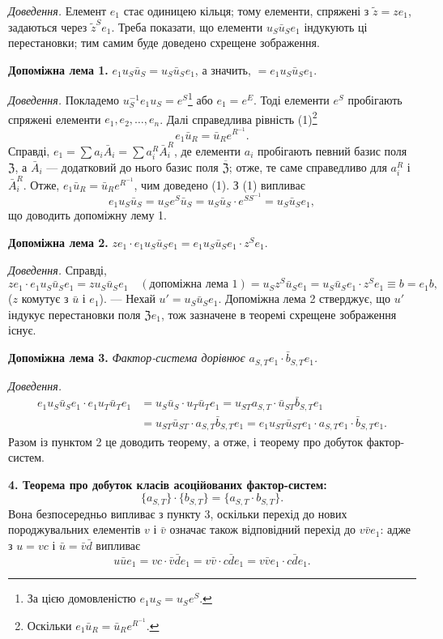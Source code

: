 \documentclass[11pt]{article}
\newcommand{\srcfn}[2]{\footnote{#2}}
\begin{document}
\noindent\emph{Доведення.} Елемент \(e_1\) стає одиницею кільця; тому елементи, спряжені з \(\tilde z=ze_1\), задаються через \(\tilde z^Se_1\). Треба показати, що елементи \(u_S\bar u_Se_1\) індукують ці перестановки; тим самим буде доведено схрещене зображення.

\noindent\textbf{Допоміжна лема 1.} \(e_1u_S\bar u_S=u_S\bar u_Se_1\), а значить, \(=e_1u_S\bar u_Se_1\).

\noindent\emph{Доведення.} Покладемо \(u_S^{-1}e_1u_S=e^S\)\srcfn{1}{За цією домовленістю \(e_1u_S=u_Se^S\).} або \(e_1=e^E\). Тоді елементи \(e^S\) пробігають спряжені елементи \(e_1,e_2,\ldots,e_n\). Далі справедлива рівність (1)\srcfn{2}{Оскільки \(e_1\bar u_R=\bar u_Re^{R^{-1}}\).}
\[
e_1\bar u_R=\bar u_Re^{R^{-1}}.
\]
Справді, \(e_1=\sum a_i\bar A_i=\sum a_i^R\bar A_i^R\), де елементи \(a_i\) пробігають певний базис поля \(\mathfrak Z\), а \(\bar A_i\) --- додатковий до нього базис поля \(\overline{\mathfrak Z}\); отже, те саме справедливо для \(a_i^R\) і \(\bar A_i^R\). Отже, \(e_1\bar u_R=\bar u_Re^{R^{-1}}\), чим доведено (1). З (1) випливає
\[
e_1u_S\bar u_S=u_Se^S\bar u_S=u_S\bar u_S\cdot e^{SS^{-1}}=u_S\bar u_Se_1,
\]
що доводить допоміжну лему 1.

\noindent\textbf{Допоміжна лема 2.} \(ze_1\cdot e_1u_S\bar u_Se_1=e_1u_S\bar u_Se_1\cdot z^Se_1\).

\noindent\emph{Доведення.} Справді,
\[
ze_1\cdot e_1u_S\bar u_Se_1
=zu_S\bar u_Se_1\quad(\text{допоміжна лема 1})
=u_Sz^S\bar u_Se_1
=u_S\bar u_Se_1\cdot z^Se_1
\equiv b=e_1b,
\]
(\(z\) комутує з \(\bar u\) і \(e_1\)). --- Нехай \(u'=u_S\bar u_Se_1\). Допоміжна лема 2 стверджує, що \(u'\) індукує перестановки поля \(\mathfrak Ze_1\), тож зазначене в теоремі схрещене зображення існує.

\noindent\textbf{Допоміжна лема 3.} \emph{Фактор-система дорівнює \(a_{S,T}e_1\cdot\bar b_{S,T}e_1\).}

\noindent\emph{Доведення.}
\[
\begin{aligned}
e_1u_S\bar u_Se_1\cdot e_1u_T\bar u_Te_1
&=u_S\bar u_S\cdot u_T\bar u_Te_1
 =u_{ST}a_{S,T}\cdot\bar u_{ST}\bar b_{S,T}e_1\\
&=u_{ST}\bar u_{ST}\cdot a_{S,T}\bar b_{S,T}e_1
 =e_1u_{ST}\bar u_{ST}e_1\cdot a_{S,T}e_1\cdot\bar b_{S,T}e_1.
\end{aligned}
\]
Разом із пунктом 2 це доводить теорему, а отже, і теорему про добуток фактор-систем.

\noindent\textbf{4. Теорема про добуток класів асоційованих фактор-систем:}
\[
\{a_{S,T}\}\cdot\{b_{S,T}\}=\{a_{S,T}\cdot b_{S,T}\}.
\]
Вона безпосередньо випливає з пункту 3, оскільки перехід до нових породжувальних елементів \(v\) і \(\bar v\) означає також відповідний перехід до \(v\bar ve_1\): адже з \(u=vc\) і \(\bar u=\bar v\bar d\) випливає
\[
u\bar ue_1=vc\cdot\bar v\bar de_1=v\bar v\cdot c\bar de_1=v\bar ve_1\cdot c\bar de_1.
\]
\end{document}
